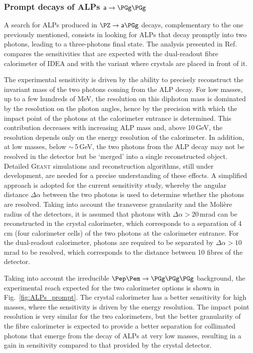 \subsubsection{Prompt decays of ALPs \texorpdfstring{$\axion \to \PGg \PGg$}{a to gamma gamma}}

A search for ALPs produced in $\PZ \to \axion \PGg$ decays, complementary to the one previously mentioned, 
consists in looking for ALPs that decay promptly into two photons, leading to a three-photons final state. 
The analysis presented in Ref.~\cite{note_ALP_Polesello} compares the sensitivities that are expected with the dual-readout fibre calorimeter of IDEA 
and with the variant where crystals are placed in front of it.

The experimental sensitivity is driven by the ability to precisely reconstruct the invariant mass of the two photons coming from the ALP decay. 
For low masses, up to a few hundreds of MeV, the resolution on this diphoton mass is dominated by the resolution on the photon angles, 
hence by the precision with which the impact point of the photons at the calorimeter entrance is determined. 
This contribution decreases with increasing ALP mass and, above 10\,GeV, the resolution depends only on the energy resolution of the calorimeter. 
In addition, at low masses, below $\sim$\,5\,GeV, the two photons from the ALP decay may not be resolved in the detector but be `merged' into a single reconstructed object.
Detailed \textsc{Geant} simulations and reconstruction algorithms, still under development, are needed for a precise understanding of these effects. 
A simplified approach is adopted for the current sensitivity study, 
whereby the angular distance $\Delta \alpha$ between the two photons is used to determine whether the photons are resolved.
Taking into account the transverse granularity and the Moli{\`e}re radius of the detectors, 
it is assumed that photons with $\Delta \alpha > 20$\,mrad can be reconstructed in the crystal calorimeter, 
which corresponds to a separation of 4\,cm (four calorimeter cells) of the two photons at the calorimeter entrance. 
For the dual-readout calorimeter, photons are required to be separated by $\Delta \alpha > 10$\,mrad to be resolved, 
which corresponds to the distance between 10 fibres of the detector.

Taking into account the irreducible $\epem \to \PGg\PGg\PGg$ background, 
the experimental reach expected for the two calorimeter options is shown in Fig.~\ref{fig:ALPs_prompt}. 
The crystal calorimeter has a better sensitivity for high masses, where the sensitivity is driven by the energy resolution.
The impact point resolution is very similar for the two calorimeters, 
but the better granularity of the fibre calorimeter is expected to provide a better separation for collimated photons that emerge from the decay of ALPs at very low masses, 
resulting in a gain in sensitivity compared to that provided by the crystal detector.


